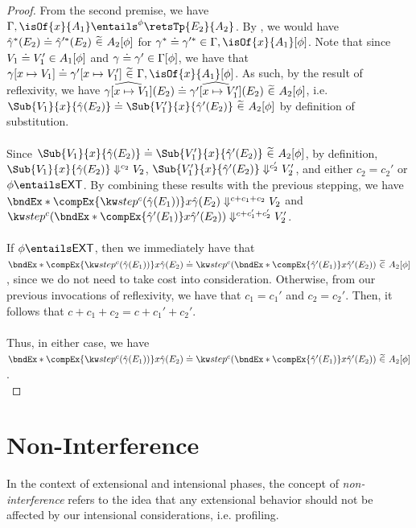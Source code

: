 \documentclass[letterpaper]{article}
\newcommand{\EXT}{\textsf{EXT}}
\newcommand{\gyat}{\hat{\gamma}}
\begin{document}
\begin{proof}
    From the second premise, we have $\Gamma, \isOf{x}{A_1} \entailsPhase{\phi} \retsTp{E_2}{A_2}$. By , we would have $\compEqOfPhase{\gyat^*(E_2)}{\gyat'^*(E_2)}{A_2}{\phi}$ for $\exEqOfPhase{\gamma^*}{\gamma'^*}{\Gamma, \isOf{x}{A_1}}{\phi}$.
    Note that since $V_1\mathrel{\doteq}V_1' \in A_1 [\phi]$ and $\gamma\mathrel{\doteq}\gamma' \in \Gamma [\phi]$, we have that $\compEqOfPhase{\gamma[x \mapsto V_1]}{\gamma'[x \mapsto V_1']}{\Gamma, \isOf{x}{A_1}}{\phi}$.  As such, by the result of reflexivity, we have
    $\widehat{\gamma[x \mapsto V_1]}(E_2)\mathrel{\doteq}\widehat{\gamma'[x \mapsto V_1']}(E_2)\ \widetilde{\in}\ A_2 [\phi]$, i.e. $\compEqOfPhase{\Sub{V_1}{x}{\gyat(E_2)}}{\Sub{V_1'}{x}{\gyat'(E_2)}}{A_2}{\phi}$ by definition of substitution.\\\\
    Since $\compEqOfPhase{\Sub{V_1}{x}{\gyat(E_2)}}{\Sub{V_1'}{x}{\gyat'(E_2)}}{A_2}{\phi}$, by definition, $\Sub{V_1}{x}{\gyat(E_2)} \evalsToC{c_2} V_2$, $\Sub{V_1'}{x}{\gyat'(E_2)} \evalsToC{c_2'} V_2'$, and either $c_2 = c_2'$ or $\phi \entails \EXT$.
    By combining these results with the previous stepping, we have $\bndEx*{\compEx{\stepEx{c}{\gyat(E_1)}}}{x}{\gyat(E_2)} \evalsToC{c + c_1 + c_2} V_2$ and $\stepEx{c}{\bndEx*{\compEx{\gyat'(E_1)}}{x}{\gyat'(E_2)}} \evalsToC{c + c_1' + c_2'} V_2'$.\\\\
    If $\phi \entails \EXT$, then we immediately have that $\compEqOfPhase{\bndEx*{\compEx{\stepEx{c}{\gyat(E_1)}}}{x}{\gyat(E_2)}}{\stepEx{c}{\bndEx*{\compEx{\gyat'(E_1)}}{x}{\gyat'(E_2)}}}{A_2}{\phi}$, since we do not need to take cost into consideration. Otherwise,
    from our previous invocations of reflexivity, we have that $c_1 = c_1'$ and $c_2 = c_2'$. Then, it follows that $c + c_1 + c_2 = c + c_1' + c_2'$.\\\\
    Thus, in either case, we have $\compEqOfPhase{\bndEx*{\compEx{\stepEx{c}{\gyat(E_1)}}}{x}{\gyat(E_2)}}{\stepEx{c}{\bndEx*{\compEx{\gyat'(E_1)}}{x}{\gyat'(E_2)}}}{A_2}{\phi}$.\\
\end{proof}

\section{Non-Interference}

In the context of extensional and intensional phases, the concept of \textit{non-interference} refers to the idea that any extensional behavior should not be affected by our intensional considerations, i.e. profiling.
\end{document}
